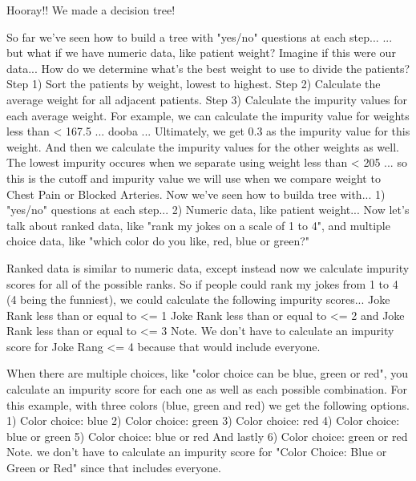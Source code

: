 \documentclass[
	final,
	a4paper,
	oneside,
	parskip=full,
	headings=standardclasses,
	headings=big,
	pointednumbers
]{scrartcl}
\begin{document}
        Hooray!! We made a decision tree!
        
        So far we've seen how to build a tree with "yes/no" questions at each step...
        ... but what if we have numeric data, like patient weight?
        Imagine if this were our data...
        How do we determine what's the best weight to use to divide the patients?
        Step 1) Sort the patients by weight, lowest to highest.
        Step 2) Calculate the average weight for all adjacent patients.
        Step 3) Calculate the impurity values for each average weight.
        For example, we can calculate the impurity value for weights less than < 167.5
        ... dooba ... Ultimately, we get 0.3 as the impurity value for this weight.
        And then we calculate the impurity values for the other weights as well.
        The lowest impurity occures when we separate using weight less than < 205
        ... so this is the cutoff and impurity value we will use when we compare
        weight to Chest Pain or Blocked Arteries.
        Now we've seen how to builda tree with...
        1) "yes/no" questions at each step...
        2) Numeric data, like patient weight...
        Now let's talk about ranked data, like "rank my jokes on a scale of
        1 to 4", and multiple choice data, like "which color do you like, red,
        blue or green?"
        
        Ranked data is similar to numeric data, except instead now we calculate
        impurity scores for all of the possible ranks.
        So if people could rank my jokes from 1 to 4 (4 being the funniest),
        we could calculate the following impurity scores...
        Joke Rank less than or equal to <= 1
        Joke Rank less than or equal to <= 2
        and Joke Rank less than or equal to <= 3
        Note. We don't have to calculate an impurity score for Joke Rang <= 4
        because that would include everyone.
        
        When there are multiple choices, like "color choice can be blue, green or
        red", you calculate an impurity score for each one as well as each possible
        combination.
        For this example, with three colors (blue, green and red) we get
        the following options.
        1) Color choice: blue
        2) Color choice: green
        3) Color choice: red
        4) Color choice: blue or green
        5) Color choice: blue or red
        And lastly
        6) Color choice: green or red
        Note. we don't have to calculate an impurity score for
        "Color Choice: Blue or Green or Red" since that includes everyone.
        
\end{document}
